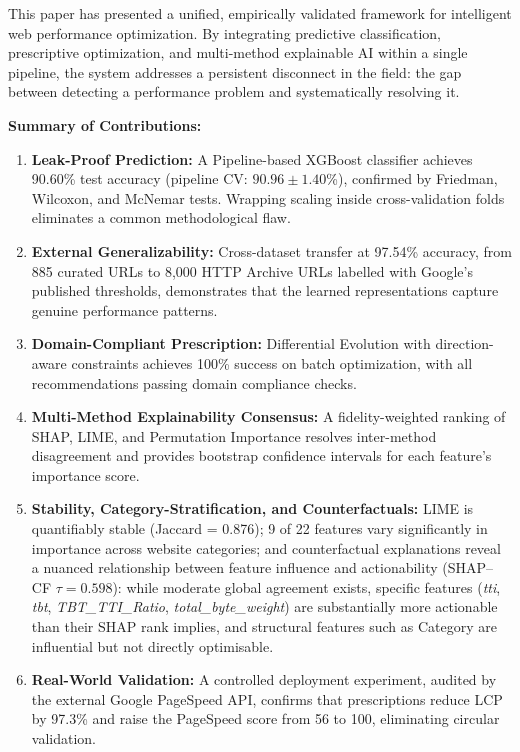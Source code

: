 \documentclass[sn-nature]{sn-jnl}
\begin{document}
This paper has presented a unified, empirically validated framework for intelligent web performance optimization. By integrating predictive classification, prescriptive optimization, and multi-method explainable AI within a single pipeline, the system addresses a persistent disconnect in the field: the gap between detecting a performance problem and systematically resolving it.

\textbf{Summary of Contributions:}

\begin{enumerate}
    \item \textbf{Leak-Proof Prediction:} A Pipeline-based XGBoost classifier achieves 90.60\% test accuracy (pipeline CV: $90.96 \pm 1.40$\%), confirmed by Friedman, Wilcoxon, and McNemar tests. Wrapping scaling inside cross-validation folds eliminates a common methodological flaw.

    \item \textbf{External Generalizability:} Cross-dataset transfer at 97.54\% accuracy, from 885 curated URLs to 8,000 HTTP Archive URLs labelled with Google's published thresholds, demonstrates that the learned representations capture genuine performance patterns.

    \item \textbf{Domain-Compliant Prescription:} Differential Evolution with direction-aware constraints achieves 100\% success on batch optimization, with all recommendations passing domain compliance checks.

    \item \textbf{Multi-Method Explainability Consensus:} A fidelity-weighted ranking of SHAP, LIME, and Permutation Importance resolves inter-method disagreement and provides bootstrap confidence intervals for each feature's importance score.

    \item \textbf{Stability, Category-Stratification, and Counterfactuals:} LIME is quantifiably stable (Jaccard = 0.876); 9 of 22 features vary significantly in importance across website categories; and counterfactual explanations reveal a nuanced relationship between feature influence and actionability (SHAP--CF $\tau = 0.598$): while moderate global agreement exists, specific features (\textit{tti}, \textit{tbt}, \textit{TBT\_TTI\_Ratio}, \textit{total\_byte\_weight}) are substantially more actionable than their SHAP rank implies, and structural features such as Category are influential but not directly optimisable.

    \item \textbf{Real-World Validation:} A controlled deployment experiment, audited by the external Google PageSpeed API, confirms that prescriptions reduce LCP by 97.3\% and raise the PageSpeed score from 56 to 100, eliminating circular validation.
\end{enumerate}
\end{document}

